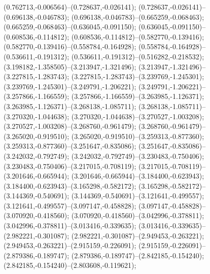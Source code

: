  (0.762713,-0.006564)--(0.728637,-0.026141);
 (0.728637,-0.026141)--(0.696138,-0.046783);
 (0.696138,-0.046783)--(0.665259,-0.068463);
 (0.665259,-0.068463)--(0.636045,-0.091150);
 (0.636045,-0.091150)--(0.608536,-0.114812);
 (0.608536,-0.114812)--(0.582770,-0.139416);
 (0.582770,-0.139416)--(0.558784,-0.164928);
 (0.558784,-0.164928)--(0.536611,-0.191312);
 (0.536611,-0.191312)--(0.516282,-0.218532);
 (3.198182,-1.358505)--(3.213947,-1.321496);
 (3.213947,-1.321496)--(3.227815,-1.283743);
 (3.227815,-1.283743)--(3.239769,-1.245301);
 (3.239769,-1.245301)--(3.249791,-1.206221);
 (3.249791,-1.206221)--(3.257866,-1.166559);
 (3.257866,-1.166559)--(3.263985,-1.126371);
 (3.263985,-1.126371)--(3.268138,-1.085711);
 (3.268138,-1.085711)--(3.270320,-1.044638);
 (3.270320,-1.044638)--(3.270527,-1.003208);
 (3.270527,-1.003208)--(3.268760,-0.961479);
 (3.268760,-0.961479)--(3.265020,-0.919510);
 (3.265020,-0.919510)--(3.259313,-0.877360);
 (3.259313,-0.877360)--(3.251647,-0.835086);
 (3.251647,-0.835086)--(3.242032,-0.792749);
 (3.242032,-0.792749)--(3.230483,-0.750406);
 (3.230483,-0.750406)--(3.217015,-0.708119);
 (3.217015,-0.708119)--(3.201646,-0.665944);
 (3.201646,-0.665944)--(3.184400,-0.623943);
 (3.184400,-0.623943)--(3.165298,-0.582172);
 (3.165298,-0.582172)--(3.144369,-0.540691);
 (3.144369,-0.540691)--(3.121641,-0.499557);
 (3.121641,-0.499557)--(3.097147,-0.458828);
 (3.097147,-0.458828)--(3.070920,-0.418560);
 (3.070920,-0.418560)--(3.042996,-0.378811);
 (3.042996,-0.378811)--(3.013416,-0.339635);
 (3.013416,-0.339635)--(2.982221,-0.301087);
 (2.982221,-0.301087)--(2.949453,-0.263221);
 (2.949453,-0.263221)--(2.915159,-0.226091);
 (2.915159,-0.226091)--(2.879386,-0.189747);
 (2.879386,-0.189747)--(2.842185,-0.154240);
 (2.842185,-0.154240)--(2.803608,-0.119621);
